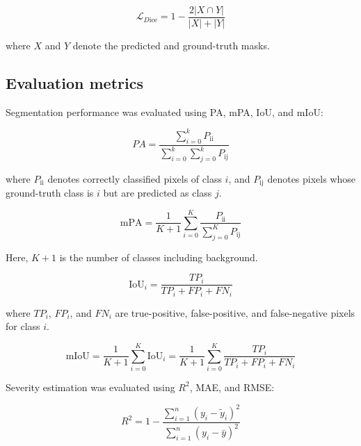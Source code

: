 \documentclass[
]{article}
\begin{document}
\begin{equation}
\mathcal{L}_{D\text{ice}} = 1 - \frac{2|X \cap Y|}{\left| X \right| + |Y|}
\tag{1}
\end{equation}

where \(X\) and \(Y\) denote the predicted and ground-truth masks.

\hypertarget{evaluation-metrics}{%
\subsection{Evaluation metrics}\label{evaluation-metrics}}

Segmentation performance was evaluated using PA, mPA, IoU, and mIoU:

\begin{equation}
PA = \frac{\sum_{i = 0}^{k}P_{\text{ii}}}{\sum_{i = 0}^{k}{\sum_{j = 0}^{k}P_{\text{ij}}}}
\tag{2}
\end{equation}

where \(P_{\text{ii}}\) denotes correctly classified pixels of class
\(i\), and \(P_{\text{ij}}\) denotes pixels whose ground-truth class is
\(i\) but are predicted as class \(j\).

\begin{equation}
\text{mPA} = \frac{1}{K + 1}\sum_{i = 0}^{K}\frac{P_{\text{ii}}}{\sum_{j = 0}^{K} P_{\text{ij}}}
\tag{3}
\end{equation}

Here, \(K+1\) is the number of classes including background.

\begin{equation}
\text{IoU}_{i} = \frac{TP_{i}}{TP_{i} + FP_{i} + FN_{i}}
\tag{4}
\end{equation}

where \(TP_{i}\), \(FP_{i}\), and \(FN_{i}\) are true-positive,
false-positive, and false-negative pixels for class \(i\).

\begin{equation}
\text{mIoU} = \frac{1}{K + 1}\sum_{i = 0}^{K}\text{IoU}_{i}
= \frac{1}{K + 1}\sum_{i = 0}^{K}\frac{TP_{i}}{TP_{i} + FP_{i} + FN_{i}}
\tag{5}
\end{equation}

Severity estimation was evaluated using \(R^{2}\), MAE, and RMSE:

\begin{equation}
R^{2} = 1 - \frac{\sum_{i = 1}^{n}\left( y_{i} - {\widetilde{y}}_{i} \right)^{2}}{\sum_{i = 1}^{n}\left( y_{i} - \bar{y} \right)^{2}}
\tag{6}
\end{equation}
\end{document}
